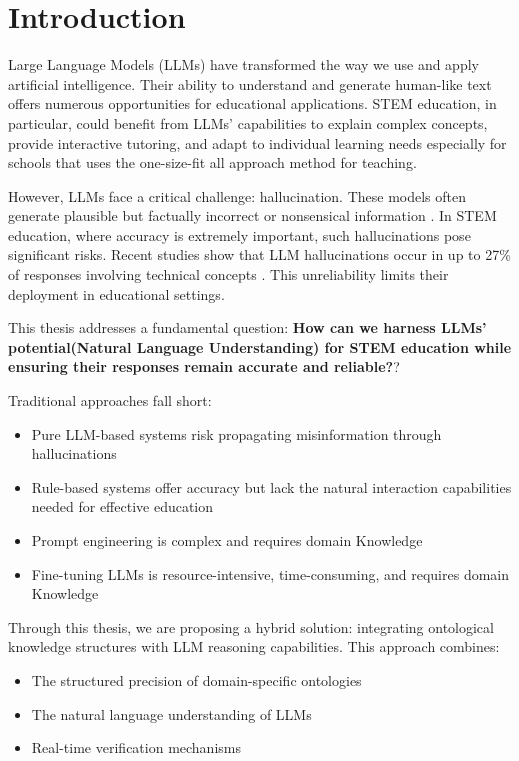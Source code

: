 \chapter{Introduction}
\label{chap:introduction}

Large Language Models (LLMs) have transformed the way we use and apply artificial intelligence. 
Their ability to understand and generate human-like text offers numerous opportunities for educational applications. 
STEM education, in particular, could benefit from LLMs' capabilities to explain complex concepts, provide interactive tutoring, and adapt to individual learning needs especially
for schools that uses the one-size-fit all approach method for teaching.

However, LLMs face a critical challenge: hallucination. These models often generate plausible but factually incorrect or nonsensical information \cite{zhang2024survey}. 
In STEM education, where accuracy is extremely important, such hallucinations pose significant risks. Recent studies show that LLM hallucinations occur in up to 27\% of responses 
involving technical concepts \cite{huang2024survey}. This unreliability limits their deployment in educational settings.

This thesis addresses a fundamental question: \textbf{How can we harness LLMs' potential(Natural Language Understanding) for STEM education while ensuring their responses 
remain accurate and reliable?}?

Traditional approaches fall short:
\begin{itemize}
    \item Pure LLM-based systems risk propagating misinformation through hallucinations 
    \item Rule-based systems offer accuracy but lack the natural interaction capabilities needed for effective education
    \item Prompt engineering is complex and requires domain Knowledge
    \item Fine-tuning LLMs is resource-intensive, time-consuming, and requires domain Knowledge 
\end{itemize}

Through this thesis, we are proposing a hybrid solution: integrating ontological knowledge structures with LLM reasoning capabilities. This approach combines:
\begin{itemize}
    \item The structured precision of domain-specific ontologies
    \item The natural language understanding of LLMs
    \item Real-time verification mechanisms
\end{itemize}

